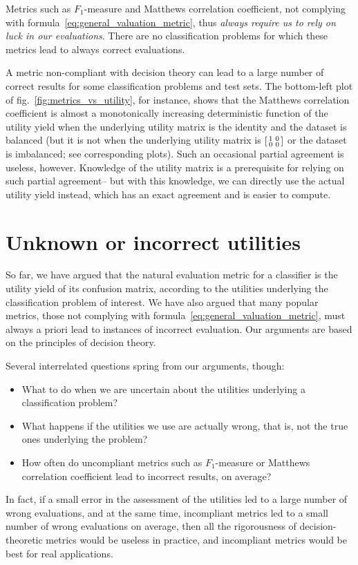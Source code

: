 \documentclass[\ifafour a4paper,12pt,\else a5paper,10pt,\fi%
onecolumn,oneside,article,%
british%
]{memoir}
\theoremstyle{remark}
\theoremstyle{innote}
\renewcommand*{\|}[1][]{\nonscript\:#1\vert\nonscript\:\mathopen{}}
\newcommand*{\fig}{fig.}%
\begin{document}
Metrics such as  $F_{1}$-measure and Matthews correlation coefficient, not complying with formula~\eqref{eq:general_valuation_metric}, thus \emph{always require us to rely on luck in our evaluations}. There are no classification problems for which these metrics lead to always correct evaluations.

\medskip

A metric non-compliant with decision theory can lead to a large number of correct results for some classification problems and test sets. The bottom-left plot of \fig~\ref{fig:metrics_vs_utility}, for instance, shows that the Matthews correlation coefficient is almost a monotonically increasing deterministic function of the utility yield when the underlying utility matrix is the identity and the dataset is balanced (but it is not when the underlying utility matrix is $\begin{bsmallmatrix} 1&0\\0&0 \end{bsmallmatrix}$ or the dataset is imbalanced; see corresponding plots). Such an occasional partial agreement is useless, however. Knowledge of the utility matrix is a prerequisite for relying on such partial agreement-- but with this knowledge, we can directly use the actual utility yield instead, which has an exact agreement and is easier to compute.


\section{Unknown or incorrect utilities}
\label{sec:unknown_wrong_utilities}

So far, we have argued that the natural evaluation metric for a classifier is the utility yield of its confusion matrix, according to the utilities underlying the classification problem of interest. We have also argued that many popular metrics, those not complying with formula~\eqref{eq:general_valuation_metric}, must always a priori lead to instances of incorrect evaluation. Our arguments are based on the principles of decision theory.

Several interrelated questions spring from our arguments, though:
\begin{itemize}
\item What to do when we are uncertain about the utilities underlying a classification problem?
\item What happens if the utilities we use are actually wrong, that is, not the true ones underlying the problem?
\item How often do uncompliant metrics such as $F_{1}$-measure or Matthews correlation coefficient lead to incorrect results, on average?
\end{itemize}
In fact, if a small error in the assessment of the utilities led to a large number of wrong evaluations, and at the same time, incompliant metrics led to a small number of wrong evaluations on average, then all the rigorousness of decision-theoretic metrics would be useless in practice, and incompliant metrics would be best for real applications.
\end{document}
